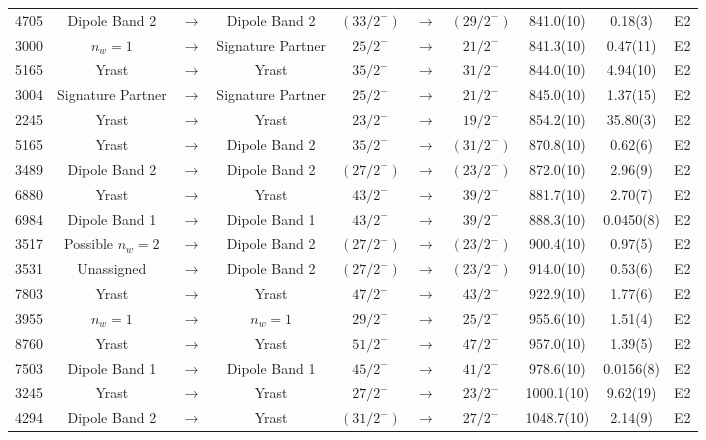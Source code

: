 \begin{landscape}
\begin{center}
\begin{longtable}{|c|ccc|ccc|c|c|c|}
 4705 &Dipole Band 2&$ \rightarrow $&Dipole Band 2&$ (33/2^{-}) $&$ \rightarrow $&$ (29/2^{-}) $& 841.0(10) & 0.18(3) & E2 \\
 3000 &$n_w=1$&$ \rightarrow $&Signature Partner&$ 25/2^{-} $&$ \rightarrow $&$ 21/2^{-} $& 841.3(10) & 0.47(11) & E2 \\
 5165 &Yrast&$ \rightarrow $&Yrast&$ 35/2^{-} $&$ \rightarrow $&$ 31/2^{-} $& 844.0(10) & 4.94(10) & E2 \\
 3004 &Signature Partner&$ \rightarrow $&Signature Partner&$ 25/2^{-} $&$ \rightarrow $&$ 21/2^{-} $& 845.0(10) & 1.37(15) & E2 \\
 2245 &Yrast&$ \rightarrow $&Yrast&$ 23/2^{-} $&$ \rightarrow $&$ 19/2^{-} $& 854.2(10) & 35.80(3) & E2 \\
 5165 &Yrast&$ \rightarrow $&Dipole Band 2&$ 35/2^{-} $&$ \rightarrow $&$ (31/2^{-}) $& 870.8(10) & 0.62(6) & E2 \\
 3489 &Dipole Band 2&$ \rightarrow $&Dipole Band 2&$ (27/2^{-}) $&$ \rightarrow $&$ (23/2^{-}) $& 872.0(10) & 2.96(9) & E2 \\
 6880 &Yrast&$ \rightarrow $&Yrast&$ 43/2^{-} $&$ \rightarrow $&$ 39/2^{-} $& 881.7(10) & 2.70(7) & E2 \\
 6984 &Dipole Band 1&$ \rightarrow $&Dipole Band 1&$ 43/2^{-} $&$ \rightarrow $&$ 39/2^{-} $& 888.3(10) & 0.0450(8) & E2 \\
 3517 &Possible $n_w=2$&$ \rightarrow $&Dipole Band 2&$ (27/2^{-}) $&$ \rightarrow $&$ (23/2^{-}) $& 900.4(10) & 0.97(5) & E2 \\
 3531 &Unassigned&$ \rightarrow $&Dipole Band 2&$ (27/2^{-}) $&$ \rightarrow $&$ (23/2^{-}) $& 914.0(10) & 0.53(6) & E2 \\
 7803 &Yrast&$ \rightarrow $&Yrast&$ 47/2^{-} $&$ \rightarrow $&$ 43/2^{-} $& 922.9(10) & 1.77(6) & E2 \\
 3955 &$n_w=1$&$ \rightarrow $&$n_w=1$&$ 29/2^{-} $&$ \rightarrow $&$ 25/2^{-} $& 955.6(10) & 1.51(4) & E2 \\
 8760 &Yrast&$ \rightarrow $&Yrast&$ 51/2^{-} $&$ \rightarrow $&$ 47/2^{-} $& 957.0(10) & 1.39(5) & E2 \\
 7503 &Dipole Band 1&$ \rightarrow $&Dipole Band 1&$ 45/2^{-} $&$ \rightarrow $&$ 41/2^{-} $& 978.6(10) & 0.0156(8) & E2 \\
 3245 &Yrast&$ \rightarrow $&Yrast&$ 27/2^{-} $&$ \rightarrow $&$ 23/2^{-} $& 1000.1(10) & 9.62(19) & E2 \\
 4294 &Dipole Band 2&$ \rightarrow $&Yrast&$ (31/2^{-}) $&$ \rightarrow $&$ 27/2^{-} $& 1048.7(10) & 2.14(9) & E2 \\

\end{longtable}
\end{center}
\end{landscape}

